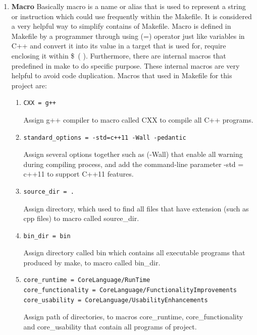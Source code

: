 \documentclass[11pt]{report}
\begin{document}
\begin{enumerate}
\item \textbf{Macro} Basically macro is a name or alias that is used to represent a string or instruction which could use frequently within the Makefile. It is considered a very helpful way to simplify contains of Makefile. Macro is defined in Makefile by a programmer through using (=) operator just like variables in C++ and convert it into its value in a target that is used for, require enclosing it within \$~( ). Furthermore, there are internal macros that predefined in make to do specific purpose. These internal macros are very helpful to avoid code duplication. Macros that used in Makefile for this project are:

\begin{enumerate}

\item \begin{verbatim}
CXX = g++ 
\end{verbatim}
Assign g++ compiler to macro called CXX to compile all C++ programs.


\item \begin{verbatim}
standard_options = -std=c++11 -Wall -pedantic
\end{verbatim}
Assign several options together such as (-Wall) that enable all warning during compiling process, and add the command-line parameter -std = c++11 to support C++11 features.

\item \begin{verbatim}
source_dir = .
\end{verbatim}
Assign directory, which used to find all files that have extension (such as cpp files)  to macro called source\_dir.

\item \begin{verbatim}
bin_dir = bin
\end{verbatim}
Assign directory called bin which contains all executable programs that produced by make, to macro called bin\_dir.

\item \begin{verbatim}
core_runtime = CoreLanguage/RunTime
core_functionality = CoreLanguage/FunctionalityImprovements
core_usability = CoreLanguage/UsabilityEnhancements
\end{verbatim}
Assign path of directories, to macros core\_runtime, core\_functionality and core\_usability that contain all programs of project.


\end{enumerate}
\end{enumerate}
\end{document}
